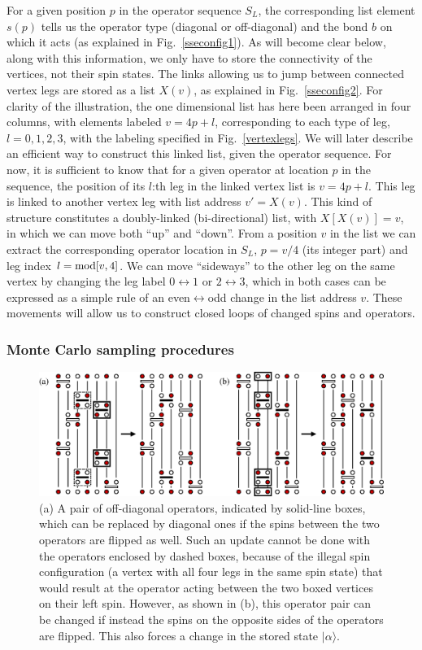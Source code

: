 \documentclass[draft,numberedheadings]{aipproc}
\begin{document}
For a given position $p$ in the operator sequence $S_L$, the corresponding list element $s(p)$ tells us the operator type (diagonal or off-diagonal) and the 
bond $b$ on which it acts (as explained in Fig.~\ref{sseconfig1}). As will become clear below, along with this information, we only have to store the 
connectivity of the vertices, not their spin states. The links allowing us to jump between connected vertex legs are stored as a list $X(v)$, as explained 
in Fig.~\ref{sseconfig2}. For clarity of the illustration, the one dimensional list has here been arranged in four columns, with elements labeled $v=4p+l$, 
corresponding to each type of leg, $l=0,1,2,3$, with the labeling specified in Fig.~\ref{vertexlegs}. We will later describe an efficient way to construct 
this linked list, given the operator sequence. For now, it is sufficient to know that for a given operator at location $p$ in the sequence, the position of 
its $l$:th leg in the linked vertex list is $v=4p+l$. This leg is linked to another vertex leg with list address $v'=X(v)$. This kind of structure constitutes 
a doubly-linked (bi-directional) list, with $X[X(v)]=v$, in which we can move both ``up'' and ``down''. From a position $v$ in the list we can extract the 
corresponding operator location in $S_L$, $p=v/4$ (its integer part) and leg index $l={\rm mod}[v,4]$. We can move ``sideways'' to the other leg on 
the same vertex by changing the leg label $0 \leftrightarrow 1$ or $2 \leftrightarrow 3$, which in both cases can be expressed as a simple rule of an 
even$\leftrightarrow$odd change in the list address $v$. These movements will allow us to construct closed loops of changed spins and operators.

\subsubsection{Monte Carlo sampling procedures}

\begin{figure}
\includegraphics[width=14cm]{localupdate.eps}
\caption{(a) A pair of off-diagonal operators, indicated by solid-line boxes, which can be replaced by diagonal ones if the spins between the two 
operators are flipped as well. Such an update cannot be done with the operators enclosed by dashed boxes, because of the illegal spin configuration 
(a vertex with all four legs in the same spin state) that would result at the operator acting between the two boxed vertices on their left spin.
However, as shown in (b), this operator pair can be changed if instead the spins on the opposite sides of the operators are flipped. This also forces
a change in the stored state $|\alpha\rangle$.}
\label{localsseupdate}
\end{figure}
\end{document}
